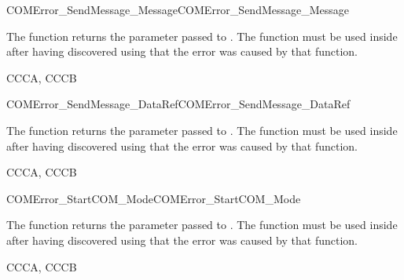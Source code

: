 \begin{function_nopb2}{COMError\_SendMessage\_Message}{COMError_SendMessage_Message}
  \begin{fundescription}
    The function returns the  parameter passed to
    . The function must be used inside  
     after having discovered using  that the error 
     was caused by that function.
  \end{fundescription}
  \begin{funreturn}
  \end{funreturn}
  \begin{funconformance}
   CCCA, CCCB
  \end{funconformance}
\end{function_nopb2}

\begin{function_nopb2}{COMError\_SendMessage\_DataRef}{COMError_SendMessage_DataRef}
  \begin{fundescription}
    The function returns the  parameter passed to
    . The function must be used inside  
     after having discovered using  that the error 
     was caused by that function.
  \end{fundescription}
  \begin{funreturn}
  \end{funreturn}
  \begin{funconformance}
   CCCA, CCCB
  \end{funconformance}
\end{function_nopb2}

\begin{function_nopb2}{COMError\_StartCOM\_Mode}{COMError_StartCOM_Mode}
  \begin{fundescription}
    The function returns the  parameter passed to
    . The function must be used inside
     after having discovered using
     that the error was caused by that
    function.
  \end{fundescription}
  \begin{funreturn}
  \end{funreturn}
  \begin{funconformance}
   CCCA, CCCB
  \end{funconformance}
\end{function_nopb2}

